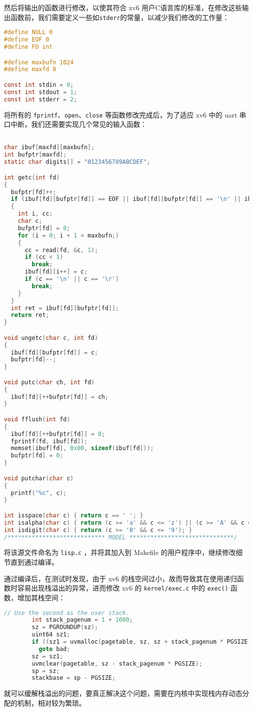 然后将输出的函数进行修改，以使其符合 xv6 用户C语言库的标准，在修改这些输出函数前，我们需要定义一些如\lstinline{stderr}的常量，以减少我们修改的工作量：
\begin{lstlisting}[language=C]
#define NULL 0
#define EOF 0
#define FD int

#define maxbufn 1024
#define maxfd 8

const int stdin = 0;
const int stdout = 1;
const int stderr = 2;
\end{lstlisting}

将所有的 \lstinline{fprintf}、\lstinline{open}、\lstinline{close} 等函数修改完成后，为了适应 xv6 中的 uart 串口中断，我们还需要实现几个常见的输入函数：
\begin{lstlisting}[language=C]

char ibuf[maxfd][maxbufn];
int bufptr[maxfd];
static char digits[] = "0123456789ABCDEF";

int getc(int fd)
{
  bufptr[fd]++;
  if (ibuf[fd][bufptr[fd]] == EOF || ibuf[fd][bufptr[fd]] == '\n' || ibuf[fd][bufptr[fd]] == '\r')
  {
    int i, cc;
    char c;
    bufptr[fd] = 0;
    for (i = 0; i + 1 < maxbufn;)
    {
      cc = read(fd, &c, 1);
      if (cc < 1)
        break;
      ibuf[fd][i++] = c;
      if (c == '\n' || c == '\r')
        break;
    }
  }
  int ret = ibuf[fd][bufptr[fd]];
  return ret;
}

void ungetc(char c, int fd)
{
  ibuf[fd][bufptr[fd]] = c;
  bufptr[fd]--;
}

void putc(char ch, int fd)
{
  ibuf[fd][++bufptr[fd]] = ch;
}

void fflush(int fd)
{
  ibuf[fd][++bufptr[fd]] = 0;
  fprintf(fd, ibuf[fd]);
  memset(ibuf[fd], 0x00, sizeof(ibuf[fd]));
  bufptr[fd] = 0;
}

void putchar(char c)
{
  printf("%c", c);
}

int isspace(char c) { return c == ' '; }
int isalpha(char c) { return (c >= 'a' && c <= 'z') || (c >= 'A' && c <= 'Z'); }
int isdigit(char c) { return (c >= '0' && c <= '9'); }
/**************************** MODEL ******************************/
\end{lstlisting}

将该源文件命名为 \lstinline{lisp.c} ，并将其加入到 Makefile 的用户程序中，继续修改细节直到通过编译。

\begin{theorem}[爆栈问题]
    通过编译后，在测试时发现，由于 xv6 的栈空间过小，故而导致其在使用递归函数时容易出现栈溢出的异常，进而修改 xv6 的 \lstinline{kernel/exec.c} 中的 \lstinline{exec()} 函数，增加其栈空间：
    \begin{lstlisting}[language=C]
        // Use the second as the user stack.
        int stack_pagenum = 1 + 1000;
        sz = PGROUNDUP(sz);
        uint64 sz1;
        if ((sz1 = uvmalloc(pagetable, sz, sz + stack_pagenum * PGSIZE)) == 0)
          goto bad;
        sz = sz1;
        uvmclear(pagetable, sz - stack_pagenum * PGSIZE);
        sp = sz;
        stackbase = sp - PGSIZE;
    \end{lstlisting}
    就可以缓解栈溢出的问题，要真正解决这个问题，需要在内核中实现栈内存动态分配的机制，相对较为繁琐。
\end{theorem}

